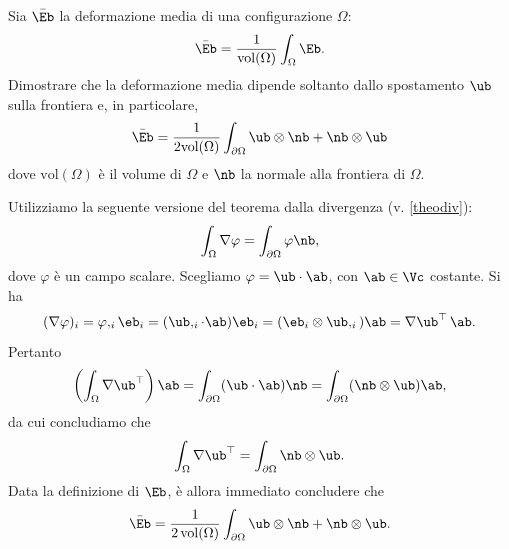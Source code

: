 \begin{exercise}\label{defmedia}
Sia $\bar\Eb$ la deformazione media di una configurazione ${\Omega}$:
\begin{equation}
	\bar{\Eb}=\frac{1}{\textrm{vol}({\Omega})}\int_{\Omega}\Eb.
\end{equation}
Dimostrare che la deformazione media dipende soltanto dallo spostamento $\ub$ sulla frontiera e, in particolare,
\begin{equation}
	\bar{\Eb}=\frac{1}{2\textrm{vol}(\Omega)}\int_{\partial{\Omega}}\ub\otimes\nb+\nb\otimes\ub
\end{equation}
dove $\textrm{vol}(\Omega)$ è il volume di $\Omega$  e $\nb$ la normale alla frontiera di ${\Omega}$. 

\begin{svolgimento}
Utilizziamo la seguente versione del teorema dalla divergenza (v. \eqref{theodiv}):
\begin{equation}
\int_{\Omega}\nabla \varphi=\int_{\partial\Omega}\varphi\nb,
\end{equation}
dove $\varphi$ è un campo scalare. Scegliamo $\varphi=\ub \cdot\ab$, con $\ab\in\Vc$ costante. Si ha
\begin{equation}
(\nabla \varphi)_i=\varphi,_i \eb_i=(\ub,_{i}\cdot \ab)\eb_i=(\eb_i \otimes \ub,_i)\ab=\nabla\ub ^\top \, \ab.
\end{equation}
Pertanto
\begin{equation}
\left( \int_{\Omega}\nabla\ub ^\top  \right)\ab =\int_{\partial{\Omega}}(\ub\cdot\ab)\nb=\int_{\partial{\Omega}}(\nb \otimes \ub)\ab,
\end{equation}
da cui concludiamo che 
\begin{equation}
\int_{\Omega}\nabla\ub ^\top =\int_{\partial{\Omega}}\nb \otimes \ub.
\end{equation}
Data la definizione di $\Eb$, è allora immediato concludere che
\begin{equation}
	\bar{\Eb}=\frac{1}{2\operatorname{vol}(\Omega)}\int_{\partial{\Omega}}\ub\otimes\nb+\nb\otimes\ub.
\end{equation}
\end{svolgimento}
\end{exercise}

